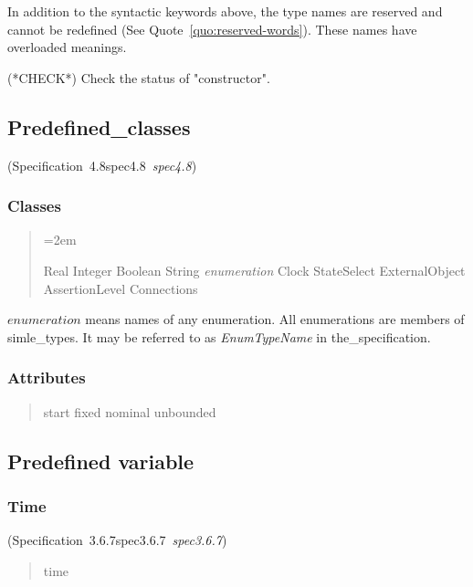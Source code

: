 \documentclass[10pt,b5paper]{article}
\def\specrefx#1#2{Specification~#1\ifx\relax#2\relax{}\else~{\it{}#2}\fi}
\def\specref#1{\specrefx{#1}{\csname spec#1\endcsname}}
\begin{document}
\noindent
In addition to the syntactic keywords above, the type names are
reserved and cannot be redefined (See Quote~\ref{quo:reserved-words}).
These names have overloaded meanings.

(*CHECK*) Check the status of "constructor".


\subsection{Predefined_classes}

(\specref{4.8}\/)

\subsubsection*{Classes}

\begin{quote}
\spaceskip=2em
\sloppy{}

Real
Integer
Boolean
String
{\it{}enumeration}
Clock
StateSelect
ExternalObject
AssertionLevel
Connections

\end{quote}

\noindent $\mathit{enumeration}$ means names of any enumeration.  All
enumerations are members of simle_types.  It may be referred to as
{\it{}EnumTypeName\/} in the_specification.

\subsubsection*{Attributes}

\begin{quote}\widespacing

start
fixed
nominal
unbounded

\end{quote}


\subsection{Predefined variable}

\subsubsection*{Time}

(\specref{3.6.7}\/)

\begin{quote}\widespacing
time
\end{quote}
\end{document}
